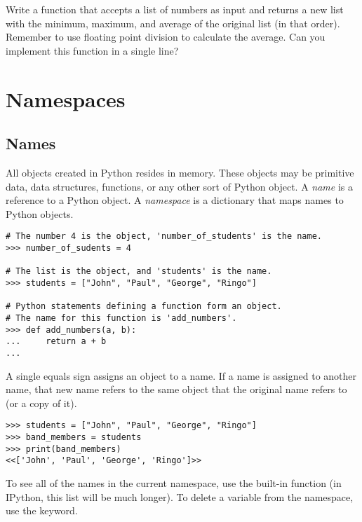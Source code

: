 \begin{problem}
Write a function that accepts a list of numbers as input and returns a new list with the minimum, maximum, and average of the original list (in that order).
Remember to use floating point division to calculate the average.
Can you implement this function in a single line?
\end{problem}

\section*{Namespaces}

\subsection*{Names}
All objects created in Python resides in memory.
These objects may be primitive data, data structures, functions, or any other sort of Python object.
A \emph{name} is a reference to a Python object.
A \emph{namespace} is a dictionary that maps names to Python objects.

\begin{lstlisting}
# The number 4 is the object, 'number_of_students' is the name.
>>> number_of_sudents = 4

# The list is the object, and 'students' is the name.
>>> students = ["John", "Paul", "George", "Ringo"]

# Python statements defining a function form an object.
# The name for this function is 'add_numbers'.
>>> def add_numbers(a, b):
...     return a + b
... 
\end{lstlisting}

A single equals sign assigns an object to a name.
If a name is assigned to another name, that new name refers to the same object that the original name refers to (or a copy of it).

\begin{lstlisting}
>>> students = ["John", "Paul", "George", "Ringo"]
>>> band_members = students
>>> print(band_members)
<<['John', 'Paul', 'George', 'Ringo']>>
\end{lstlisting}

To see all of the names in the current namespace, use the built-in function  (in IPython, this list will be much longer).
To delete a variable from the namespace, use the  keyword.

